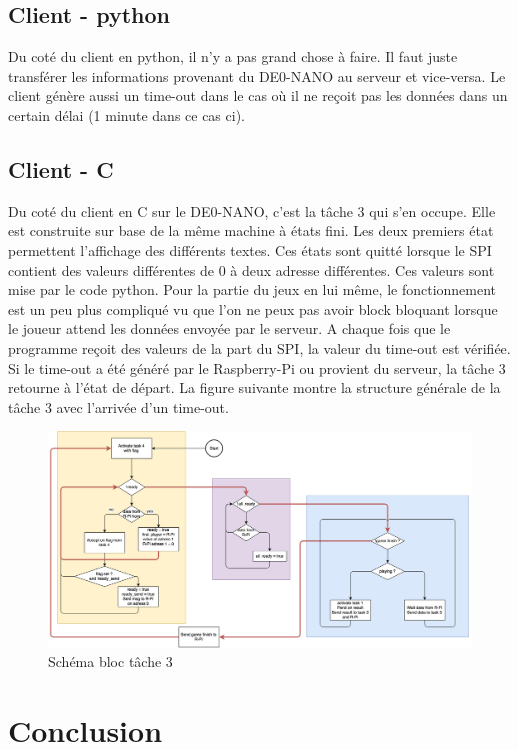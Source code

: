 \section{Client - python}

Du coté du client en python, il n'y a pas grand chose à faire. Il faut juste transférer les informations provenant du DE0-NANO au serveur et vice-versa. Le client génère aussi un time-out dans le cas où il ne reçoit pas les données dans un certain délai (1 minute dans ce cas ci).
\section{Client - C}
Du coté du client en C sur le DE0-NANO, c'est la tâche 3 qui s'en occupe. 
Elle est construite sur base de la même machine à états fini. Les deux premiers état permettent l'affichage des différents textes. Ces états sont quitté lorsque le SPI contient des valeurs différentes de 0 à deux adresse différentes. Ces valeurs sont mise par le code python. 
Pour la partie du jeux en lui même, le fonctionnement est un peu plus compliqué vu que l'on ne peux pas avoir block bloquant lorsque le joueur attend les données envoyée par le serveur.
A chaque fois que le programme reçoit des valeurs de la part du SPI, la valeur du time-out est vérifiée. Si le time-out a été généré par le Raspberry-Pi ou provient du serveur, la tâche 3 retourne à l'état de départ.
La figure suivante montre la structure générale de la tâche 3 avec l'arrivée d'un time-out.
\begin{figure}[!ht]
\centering
\includegraphics[scale=0.17, angle=90]{img/task3.png}
\caption{Schéma bloc tâche 3}
\label{fig9}
\end{figure}
\chapter{Conclusion}
